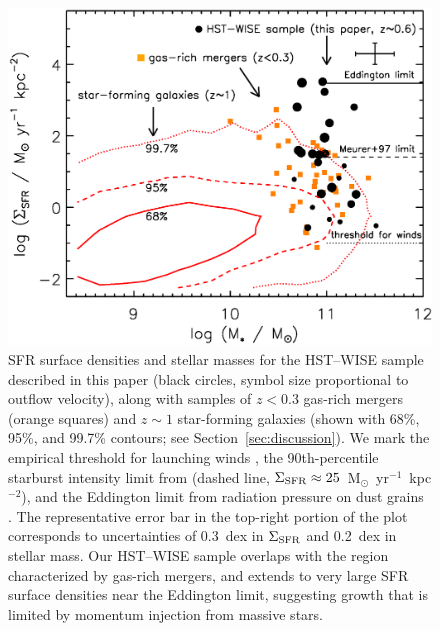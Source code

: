 \documentclass[12pt,preprint]{aastex}
\newcommand{\units}{M$_{\odot}$~yr$^{-1}$~kpc$^{-2}$}
\newcommand{\sigmasfr}{\Sigma_{\textnormal{\scriptsize{SFR}}}}
\begin{document}
\begin{figure}[!t]
\begin{center}
\includegraphics[angle=0,scale=.78]{f4.ps} 
\caption{SFR surface densities and stellar masses for the HST--WISE
  sample described in this paper (black circles, symbol size
  proportional to outflow velocity), along with samples of $z<0.3$
  gas-rich mergers (orange squares) and $z\sim1$ star-forming galaxies
  (shown with 68\%, 95\%, and 99.7\% contours; see
  Section~\ref{sec:discussion}).  We mark the empirical threshold for
  launching winds \citep[dotted line,
    $\sigmasfr\approx0.1$~\units;][]{hec02}, the 90th-percentile
  starburst intensity limit from \citet{meu97} (dashed line,
  $\sigmasfr\approx25$~\units), and the Eddington limit from radiation
  pressure on dust grains \citep[solid line,
    $\sigmasfr\approx3000$~\units;][]{mur05,tho05,hop10}.  The
  representative error bar in the top-right portion of the plot
  corresponds to uncertainties of 0.3~dex in $\sigmasfr$ and 0.2~dex
  in stellar mass.  Our HST--WISE sample overlaps with the region
  characterized by gas-rich mergers, and extends to very large SFR
  surface densities near the Eddington limit, suggesting growth that
  is limited by momentum injection from massive stars.}
\label{fig:sigmasfr}
\end{center}
\end{figure}
\end{document}
